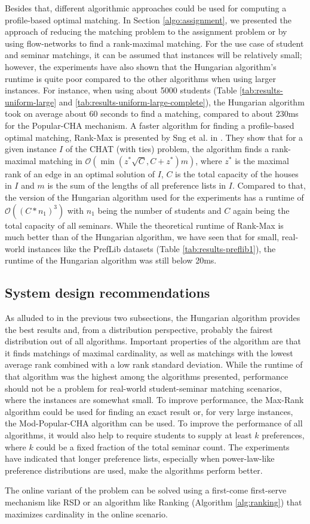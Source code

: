 Besides that, different algorithmic approaches could be used for computing a profile-based optimal matching. In Section \ref{algo:assignment}, we presented the approach of reducing the matching problem to the assignment problem or by using flow-networks to find a rank-maximal matching. For the use case of student and seminar matchings, it can be assumed that instances will be relatively small; however, the experiments have also shown that the Hungarian algorithm's runtime is quite poor compared to the other algorithms when using larger instances. For instance, when using about 5000 students (Table \ref{tab:results-uniform-large} and \ref{tab:results-uniform-large-complete}),
the Hungarian algorithm took on average about 60 seconds to find a matching, compared to about 230ms for the Popular-CHA mechanism. A faster algorithm for finding a profile-based optimal matching, Rank-Max is presented by Sng et al. in \cite{SngThesis}. They show that for a given instance $I$ of the CHAT (with ties) problem, the algorithm finds a rank-maximal matching in $\mathcal{O}(\min(z^*\sqrt{C}, C + z^*)m)$, where $z^*$ is the maximal rank of an edge in an optimal solution of $I$, $C$ is the total capacity of the houses in $I$ and $m$ is the sum of the lengths of all preference lists in $I$. Compared to that, the version of the Hungarian algorithm used for the experiments has a runtime of $\mathcal{O}((C*n_1)^3)$ with $n_1$ being the number of students and $C$ again being the total capacity of all seminars. While the theoretical runtime of Rank-Max is much better than of the Hungarian algorithm, we have seen that for small, real-world instances like the PrefLib datasets (Table \ref{tab:results-preflib1}), the runtime of the Hungarian algorithm was still below 20ms.

\subsection{System design recommendations}
As alluded to in the previous two subsections, the Hungarian algorithm provides the best results and, from a distribution perspective, probably the fairest distribution out of all algorithms. Important properties of the algorithm are that it finds matchings of maximal cardinality, as well as matchings with the lowest average rank combined with a low rank standard deviation. While the runtime of that algorithm was the highest among the algorithms presented, performance should not be a problem for real-world student-seminar matching scenarios, where the instances are somewhat small. To improve performance, the Max-Rank algorithm \cite{SngThesis} could be used for finding an exact result or, for very large instances, the Mod-Popular-CHA algorithm can be used. To improve the performance of all algorithms, it would also help to require students to supply at least $k$ preferences, where $k$ could be a fixed fraction of the total seminar count. The experiments have indicated that longer preference lists, especially when power-law-like preference distributions are used, make the algorithms perform better.

The online variant of the problem can be solved using a first-come first-serve mechanism like RSD or an algorithm like Ranking (Algorithm \ref{alg:ranking}) that maximizes cardinality in the online scenario.